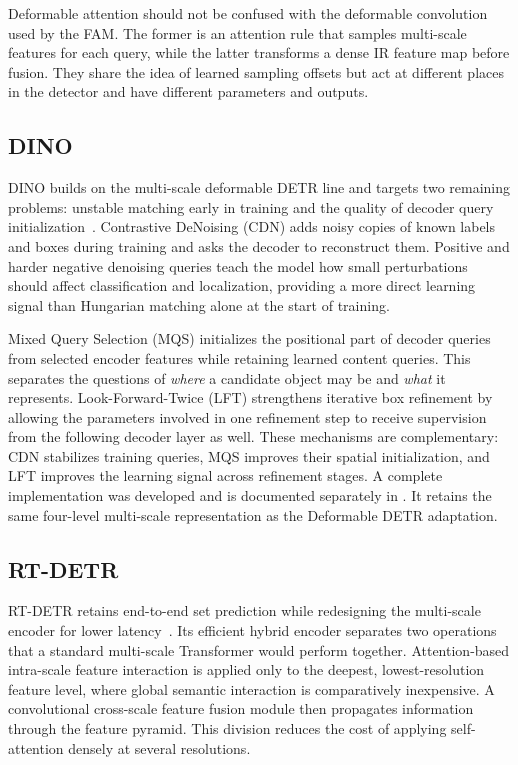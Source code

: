 Deformable attention should not be confused with the deformable convolution
used by the FAM. The former is an attention rule that samples multi-scale
features for each query, while the latter transforms a dense IR feature map before
fusion. They share the idea of learned sampling offsets but act at different
places in the detector and have different parameters and outputs.

\subsection{DINO}

DINO builds on the multi-scale deformable DETR line and targets two remaining
problems: unstable matching early in training and the quality of decoder query
initialization~\cite{zhang2023dino}. Contrastive DeNoising (CDN) adds noisy
copies of known labels and boxes during training and asks the decoder to
reconstruct them. Positive and harder negative denoising queries teach the
model how small perturbations should affect classification and localization,
providing a more direct learning signal than Hungarian matching alone at the
start of training.

Mixed Query Selection (MQS) initializes the positional part of decoder queries
from selected encoder features while retaining learned content queries. This
separates the questions of \emph{where} a candidate object may be and
\emph{what} it represents. Look-Forward-Twice (LFT) strengthens iterative box
refinement by allowing the parameters involved in one refinement step to
receive supervision from the following decoder layer as well. These mechanisms
are complementary: CDN stabilizes training queries, MQS improves their spatial
initialization, and LFT improves the learning signal across refinement stages.
A complete implementation was developed and is documented separately in
.
It retains the same four-level multi-scale representation as the Deformable
DETR adaptation.

\subsection{RT-DETR}

RT-DETR retains end-to-end set prediction while redesigning the multi-scale
encoder for lower latency~\cite{zhao2024rtdetr}. Its efficient hybrid encoder
separates two operations that a standard multi-scale Transformer would perform
together. Attention-based intra-scale feature interaction is applied only to
the deepest, lowest-resolution feature level, where global semantic
interaction is comparatively inexpensive. A convolutional cross-scale feature
fusion module then propagates information through the feature pyramid. This
division reduces the cost of applying self-attention densely at several
resolutions.

